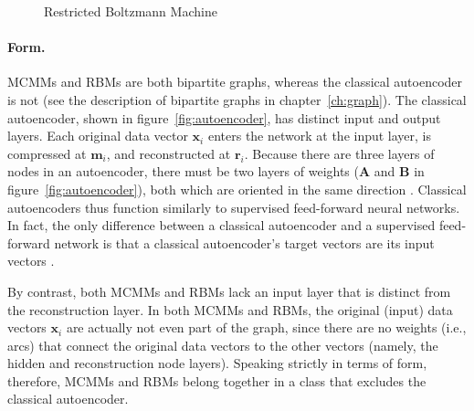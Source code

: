 \begin{figure}[t]
\caption{Restricted Boltzmann Machine} 
\label{fig:rbm}
\vspace{12pt}
\end{figure}

\paragraph{Form.}
MCMMs and RBMs are both bipartite graphs, whereas the classical autoencoder is 
not (see the description of bipartite graphs in chapter~\ref{ch:graph}).
The classical autoencoder, shown in figure~\ref{fig:autoencoder}, has distinct input 
and output layers.
Each original data vector $\textbf{x}_i$ enters the network at the input layer, is compressed 
at $\textbf{m}_i$, and reconstructed at $\textbf{r}_i$. Because there are three layers 
of nodes in an autoencoder, there must be two layers of weights ($\textbf{A}$ and $\textbf{B}$ in figure~\ref{fig:autoencoder}), both which are oriented in the same direction \citep{baldi:2012}.
Classical autoencoders thus function similarly to supervised feed-forward neural networks. 
In fact, the only difference between a classical autoencoder and a supervised 
feed-forward network is that a classical autoencoder's target vectors are its input vectors \citep{bourlard:1988}. 

By contrast, both MCMMs and RBMs lack an input layer that is distinct from the reconstruction layer. 
In both MCMMs and RBMs,
the original (input) data vectors $\textbf{x}_i$ are actually not even part of the graph, 
since there are no weights (i.e., arcs) that connect the original data vectors to the other 
vectors (namely, the hidden and reconstruction node layers). %
Speaking strictly in terms of form, therefore, MCMMs and RBMs belong together in a 
class that excludes the classical autoencoder.


